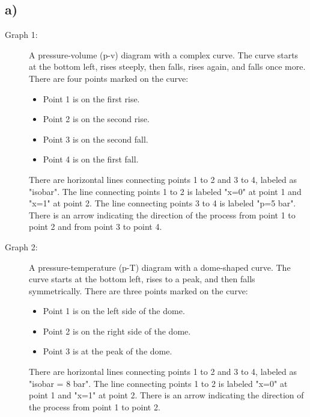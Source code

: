 

\subsection*{a)}

\begin{description}
    \item[Graph 1:] A pressure-volume (p-v) diagram with a complex curve. The curve starts at the bottom left, rises steeply, then falls, rises again, and falls once more. There are four points marked on the curve: 
    \begin{itemize}
        \item Point 1 is on the first rise.
        \item Point 2 is on the second rise.
        \item Point 3 is on the second fall.
        \item Point 4 is on the first fall.
    \end{itemize}
    There are horizontal lines connecting points 1 to 2 and 3 to 4, labeled as "isobar". The line connecting points 1 to 2 is labeled "x=0" at point 1 and "x=1" at point 2. The line connecting points 3 to 4 is labeled "p=5 bar". There is an arrow indicating the direction of the process from point 1 to point 2 and from point 3 to point 4.

    \item[Graph 2:] A pressure-temperature (p-T) diagram with a dome-shaped curve. The curve starts at the bottom left, rises to a peak, and then falls symmetrically. There are three points marked on the curve:
    \begin{itemize}
        \item Point 1 is on the left side of the dome.
        \item Point 2 is on the right side of the dome.
        \item Point 3 is at the peak of the dome.
    \end{itemize}
    There are horizontal lines connecting points 1 to 2 and 3 to 4, labeled as "isobar = 8 bar". The line connecting points 1 to 2 is labeled "x=0" at point 1 and "x=1" at point 2. There is an arrow indicating the direction of the process from point 1 to point 2.
\end{description}